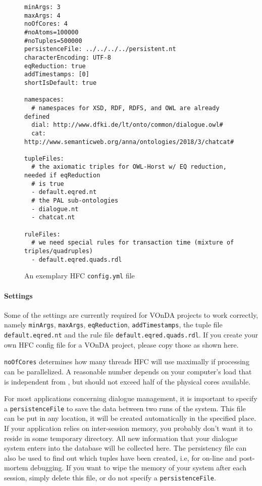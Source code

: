 \begin{figure} [htb]
\small%
\begin{verbatim}
minArgs: 3
maxArgs: 4
noOfCores: 4
#noAtoms=100000
#noTuples=500000
persistenceFile: ../../../../persistent.nt
characterEncoding: UTF-8
eqReduction: true
addTimestamps: [0]
shortIsDefault: true

namespaces:
  # namespaces for XSD, RDF, RDFS, and OWL are already defined
  dial: http://www.dfki.de/lt/onto/common/dialogue.owl#
  cat: http://www.semanticweb.org/anna/ontologies/2018/3/chatcat#

tupleFiles:
  # the axiomatic triples for OWL-Horst w/ EQ reduction, needed if eqReduction
  # is true
  - default.eqred.nt
  # the PAL sub-ontologies
  - dialogue.nt
  - chatcat.nt

ruleFiles:
  # we need special rules for transaction time (mixture of triples/quadruples)
  - default.eqred.quads.rdl
\end{verbatim}
\caption{An exemplary HFC \texttt{config.yml} file}
\label{fig:hfcconfig}
\end{figure}

\paragraph{Settings}

Some of the settings are currently required for VOnDA projects to work
correctly, namely \texttt{minArgs}, \texttt{maxArgs},
\texttt{eqReduction}, \texttt{addTimestamps}, the tuple file
\texttt{default.eqred.nt} and the rule file
\texttt{default.eqred.quads.rdl}. If you create your own HFC config
file for a VOnDA project, please copy those as shown here.

\texttt{noOfCores} determines how many threads HFC will use maximally
if processing can be parallelized. A reasonable number depends on your
computer's load that is independent from \vonda, but should not exceed
half of the physical cores available.

For most applications concerning dialogue management, it is important to
specify a \texttt{persistenceFile} to save the data between two runs of the
system. This file can be put in any location, it will be created automatically
in the specified place. If your application relies on inter-session memory,
you probably don't want it to reside in some temporary directory. All new
information that your dialogue system enters into the database will be
collected here. The persistency file can also be used to find out which tuples
have been created, i.e, for on-line and post-mortem debugging. If you want to
wipe the memory of your system after each session, simply delete this
file, or do not specify a \texttt{persistenceFile}.


